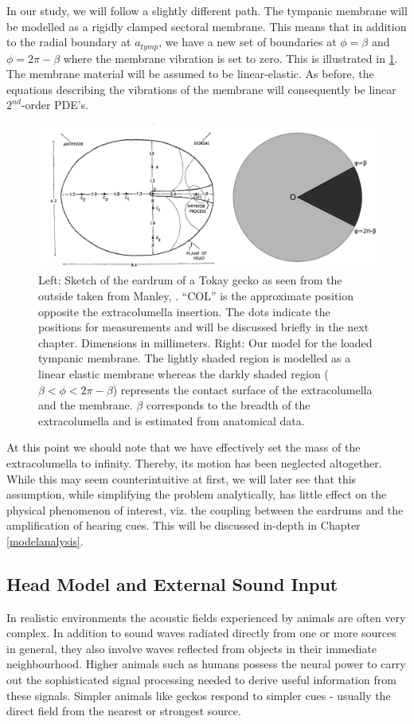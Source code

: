 In our study, we will follow a slightly different path. The tympanic membrane will be modelled as a 
rigidly clamped sectoral membrane. This means that in addition to the radial boundary at $a_{tymp}$,
we have a new set of boundaries at $\phi=\beta$ and $\phi=2\pi-\beta$ where the membrane vibration is set to zero. This is illustrated in \ref{tympanummodel}.
The membrane material will be assumed to be linear-elastic. As before, the equations describing the vibrations of the membrane will 
consequently be linear $2^{nd}$-order PDE's.
\begin{figure}[ht]
 \centering
 \includegraphics[width=.9\linewidth]{Diagrams/extracolumella2.png}
 \caption[Tympanic membrane model]{Left: Sketch of the eardrum of a Tokay gecko as seen from the outside taken from Manley, \cite{manleygecko1}. ``COL'' is
 the approximate position opposite the extracolumella insertion. The dots indicate the positions for measurements and will be discussed briefly in the
 next chapter. Dimensions
 in millimeters. Right: Our model for the loaded tympanic membrane. The lightly shaded region is modelled as a linear elastic membrane whereas the darkly shaded region 
 ($\beta<\phi<2\pi-\beta$) represents the contact surface of the extracolumella and the membrane. $\beta$ corresponds to the breadth of the extracolumella and is estimated from anatomical data.}
 \label{tympanummodel}
\end{figure}

At this point we should note that we have effectively set the mass of the extracolumella to infinity. Thereby, its motion has been neglected altogether. While this may seem counterintuitive at first, 
we will later see that this assumption, while simplifying the problem analytically,  has little effect on the physical phenomenon of interest, viz. the coupling between
the eardrums and the amplification of hearing cues. This will be discussed in-depth in Chapter \ref{modelanalysis}.

\subsection{Head Model and External Sound Input}\label{soundinput}
In realistic environments the acoustic fields experienced by animals are often very complex.
In addition to sound waves radiated directly from one or more sources in general, they also involve
waves reflected from objects in their immediate neighbourhood. Higher animals such as humans
possess the neural power to carry out the sophisticated signal processing needed to derive useful
information from these signals. Simpler animals like geckos respond to simpler cues - usually
the direct field from the nearest or strongest source.

